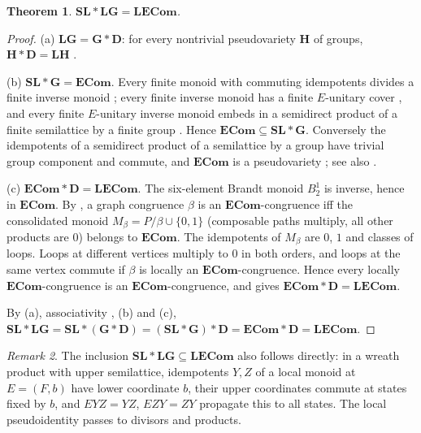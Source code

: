 \documentclass[11pt]{article}
\numberwithin{equation}{section}
\theoremstyle{plain}
\newtheorem{theorem}{Theorem}[section]
\theoremstyle{definition}
\theoremstyle{remark}
\newtheorem{remark}[theorem]{Remark}
\theoremstyle{plain}
\newcommand{\LG}{\mathbf{LG}}
\newcommand{\SL}{\mathbf{SL}}
\newcommand{\Gp}{\mathbf{G}}
\newcommand{\Dd}{\mathbf{D}}
\newcommand{\ECom}{\mathbf{ECom}}
\newcommand{\LECom}{\mathbf{L}\mathbf{ECom}}
\begin{document}
\begin{theorem}
\label{thm:SLLG-LECom}
$\SL*\LG=\LECom$.
\end{theorem}

\begin{proof}
(a) $\LG=\Gp*\Dd$: for every nontrivial pseudovariety $\mathbf H$ of groups,
$\mathbf H*\Dd=\mathbf L\mathbf H$ \cite[Example~1.3 and
Theorem~2.8]{TherienWeiss1985}.

(b) $\SL*\Gp=\ECom$.  Every finite monoid with commuting idempotents divides a
finite inverse monoid \cite{Ash1987}; every finite inverse monoid has a finite
$E$-unitary cover \cite{McAlister1974}, and every finite $E$-unitary inverse
monoid embeds in a semidirect product of a finite semilattice by a finite group
\cite{OCarroll1976}.  Hence $\ECom\subseteq\SL*\Gp$.  Conversely the idempotents
of a semidirect product of a semilattice by a group have trivial group
component and commute, and $\ECom$ is a pseudovariety \cite{Ash1987}; see also
\cite{MargolisPin1987}.

(c) $\ECom*\Dd=\LECom$.  The six-element Brandt monoid $B_2^1$ is inverse, hence
in $\ECom$.  By \cite[Theorem~1.5]{TherienWeiss1985}, a graph congruence $\beta$
is an $\ECom$-congruence iff the consolidated monoid $M_\beta=P/\beta\cup\{0,1\}$
(composable paths multiply, all other products are $0$) belongs to $\ECom$.  The
idempotents of $M_\beta$ are $0$, $1$ and classes of loops.  Loops at different
vertices multiply to $0$ in both orders, and loops at the same vertex commute if
$\beta$ is locally an $\ECom$-congruence.  Hence every locally
$\ECom$-congruence is an $\ECom$-congruence, and
\cite[Theorem~2.8]{TherienWeiss1985} gives $\ECom*\Dd=\LECom$.

By (a), associativity \cite{Tilson1987}, (b) and (c),
$\SL*\LG=\SL*(\Gp*\Dd)=(\SL*\Gp)*\Dd=\ECom*\Dd=\LECom$.
\end{proof}

\begin{remark}
The inclusion $\SL*\LG\subseteq\LECom$ also follows directly: in a wreath product
with upper semilattice, idempotents $Y,Z$ of a local monoid at $E=(F,b)$ have lower
coordinate $b$, their upper coordinates commute at states fixed by $b$, and
$EYZ=YZ$, $EZY=ZY$ propagate this to all states.  The local pseudoidentity passes
to divisors and products.
\end{remark}
\end{document}
